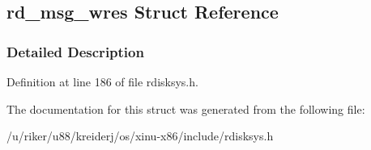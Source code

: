 \hypertarget{structrd__msg__wres}{}\subsection{rd\+\_\+msg\+\_\+wres Struct Reference}
\label{structrd__msg__wres}


\subsubsection{Detailed Description}


Definition at line 186 of file rdisksys.\+h.



The documentation for this struct was generated from the following file\+:\begin{DoxyCompactItemize}
\item 
/u/riker/u88/kreiderj/os/xinu-\/x86/include/rdisksys.\+h\end{DoxyCompactItemize}
